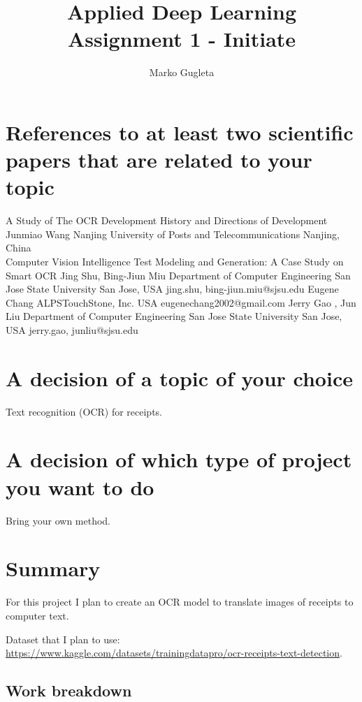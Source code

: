 \documentclass[]{article}
\title{Applied Deep Learning\\ Assignment 1 - Initiate}
\author{Marko Gugleta}
\begin{document}
\maketitle

\section{References to at least two scientific papers that are related to your topic}

A Study of The OCR Development History and Directions of
Development
Junmiao Wang
Nanjing University of Posts and Telecommunications Nanjing, China \\

Computer Vision Intelligence Test Modeling and
Generation: A Case Study on Smart OCR
Jing Shu, Bing-Jiun Miu
Department of Computer Engineering
San Jose State University
San Jose, USA
{jing.shu, bing-jiun.miu}@sjsu.edu
Eugene Chang
ALPSTouchStone, Inc.
USA
eugenechang2002@gmail.com
Jerry Gao
, Jun Liu
Department of Computer Engineering
San Jose State University
San Jose, USA
{jerry.gao, junliu}@sjsu.edu

\section{A decision of a topic of your choice}

Text recognition (OCR) for receipts.

\section{A decision of which type of project you want to do}

Bring your own method.

\section{Summary}

For this project I plan to create an OCR model to translate images of receipts to computer text.

Dataset that I plan to use:  \url{https://www.kaggle.com/datasets/trainingdatapro/ocr-receipts-text-detection}.

\subsection{Work breakdown}

\
\end{document}
